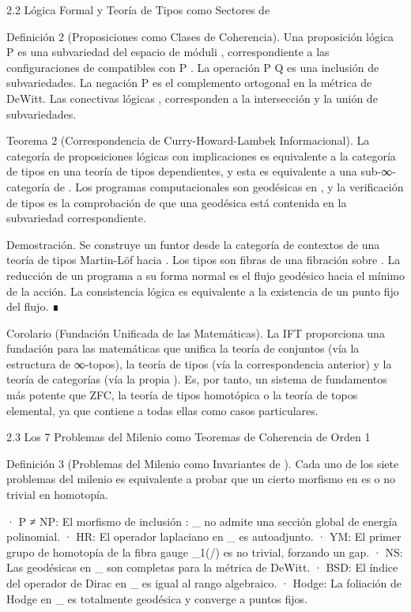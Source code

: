 \documentclass[12pt,a4paper]{book}
\begin{document}
2.2 Lógica Formal y Teoría de Tipos como Sectores de   

Definición 2 (Proposiciones como Clases de Coherencia). Una proposición lógica  P  es una subvariedad del espacio de móduli   , correspondiente a las configuraciones de  \rho  compatibles con  P . La operación  P \implies Q  es una inclusión de subvariedades. La negación  \neg P  es el complemento ortogonal en la métrica de DeWitt. Las conectivas lógicas  \land, \lor  corresponden a la intersección y la unión de subvariedades.

Teorema 2 (Correspondencia de Curry-Howard-Lambek Informacional). La categoría de proposiciones lógicas con implicaciones es equivalente a la categoría de tipos en una teoría de tipos dependientes, y esta es equivalente a una sub-∞-categoría de   . Los programas computacionales son geodésicas en   , y la verificación de tipos es la comprobación de que una geodésica está contenida en la subvariedad correspondiente.

Demostración. Se construye un funtor desde la categoría de contextos de una teoría de tipos Martin-Löf hacia   . Los tipos son fibras de una fibración sobre   . La reducción de un programa a su forma normal es el flujo geodésico hacia el mínimo de la acción. La consistencia lógica es equivalente a la existencia de un punto fijo del flujo. ∎

Corolario (Fundación Unificada de las Matemáticas). La IFT proporciona una fundación para las matemáticas que unifica la teoría de conjuntos (vía la estructura de ∞-topos), la teoría de tipos (vía la correspondencia anterior) y la teoría de categorías (vía la propia   ). Es, por tanto, un sistema de fundamentos más potente que ZFC, la teoría de tipos homotópica o la teoría de topos elemental, ya que contiene a todas ellas como casos particulares.

2.3 Los 7 Problemas del Milenio como Teoremas de Coherencia de Orden 1

Definición 3 (Problemas del Milenio como Invariantes de   ). Cada uno de los siete problemas del milenio es equivalente a probar que un cierto morfismo en    es o no trivial en homotopía.

· P ≠ NP: El morfismo de inclusión  \iota: _{} \hookrightarrow {}  no admite una sección global de energía polinomial.
· HR: El operador laplaciano en  _{}  es autoadjunto.
· YM: El primer grupo de homotopía de la fibra gauge  \pi_1(/)  es no trivial, forzando un gap.
· NS: Las geodésicas en  _{}  son completas para la métrica de DeWitt.
· BSD: El índice del operador de Dirac en  _{}  es igual al rango algebraico.
· Hodge: La foliación de Hodge en  _{}  es totalmente geodésica y converge a puntos fijos.
\end{document}
